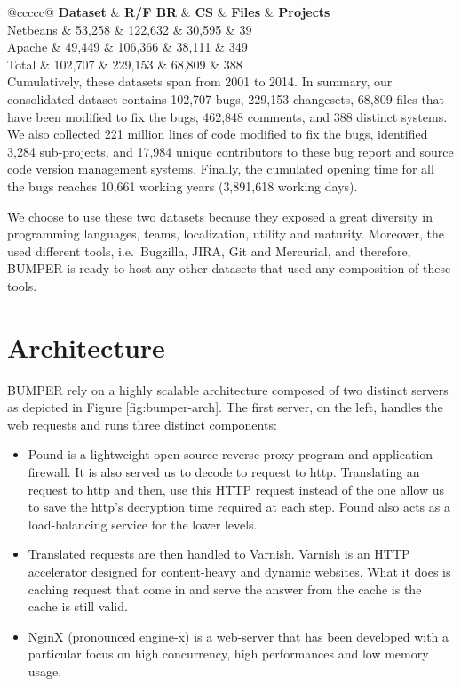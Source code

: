 {@c\textbar{}c\textbar{}c\textbar{}c\textbar{}c@} \textbf{Dataset} \&
\textbf{R/F BR} \& \textbf{CS} \& \textbf{Files} \& \textbf{Projects}\\
Netbeans \& 53,258 \& 122,632 \& 30,595 \& 39\\
Apache \& 49,449 \& 106,366 \& 38,111 \& 349\\
Total \& 102,707 \& 229,153 \& 68,809 \& 388\\
Cumulatively, these datasets span from 2001 to 2014. In summary, our
consolidated dataset contains 102,707 bugs, 229,153 changesets, 68,809
files that have been modified to fix the bugs, 462,848 comments, and 388
distinct systems. We also collected 221 million lines of code modified
to fix the bugs, identified 3,284 sub-projects, and 17,984 unique
contributors to these bug report and source code version management
systems. Finally, the cumulated opening time for all the bugs reaches
10,661 working years (3,891,618 working days).

We choose to use these two datasets because they exposed a great
diversity in programming languages, teams, localization, utility and
maturity. Moreover, the used different tools, i.e.~Bugzilla, JIRA, Git
and Mercurial, and therefore, BUMPER is ready to host any other datasets
that used any composition of these tools.

\section{Architecture}\label{architecture}

{BUMPER} rely on a highly scalable architecture composed of two distinct
servers as depicted in Figure {[}fig:bumper-arch{]}. The first server,
on the left, handles the web requests and runs three distinct
components:

\begin{itemize}
\item
  Pound is a lightweight open source reverse proxy program and
  application firewall. It is also served us to decode to request to
  http. Translating an request to http and then, use this HTTP request
  instead of the one allow us to save the http's decryption time
  required at each step. Pound also acts as a load-balancing service for
  the lower levels.
\item
  Translated requests are then handled to Varnish. Varnish is an HTTP
  accelerator designed for content-heavy and dynamic websites. What it
  does is caching request that come in and serve the answer from the
  cache is the cache is still valid.
\item
  NginX (pronounced engine-x) is a web-server that has been developed
  with a particular focus on high concurrency, high performances and low
  memory usage.
\end{itemize}

